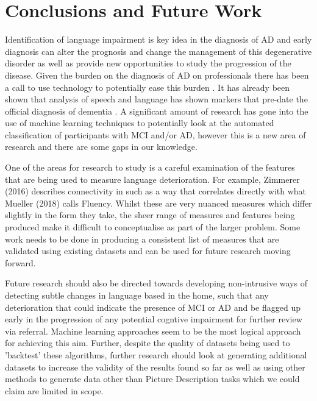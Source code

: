 \documentclass[a4paper]{article}
\begin{document}
\section{Conclusions and Future Work}
\par
Identification of language impairment is key idea in the diagnosis of AD and early diagnosis can alter the prognosis and change the management of this degenerative disorder as well as provide new opportunities to study the progression of the disease. Given the burden on the diagnosis of AD on professionals there has been a call to use technology to potentially ease this burden \cite{Boschi2017}. It has already been shown that analysis of speech and language has shown markers that pre-date the official diagnosis of dementia \cite{Snowdon1996, Berisha2015}. A significant amount of research has gone into the use of machine learning techniques to potentially look at the automated classification of participants with MCI and/or AD, however this is a new area of research and there are some gaps in our knowledge. \newline 
\par
One of the areas for research to study is a careful examination of the features that are being used to measure language deterioration. For example, Zimmerer (2016) \cite{Zimmerer2016} describes connectivity in such as a way that correlates directly with what Mueller (2018) \cite{Mueller2018a} calls Fluency. Whilst these are very nuanced measures which differ slightly in the form they take, the sheer range of measures and features being produced make it difficult to conceptualise as part of the larger problem. Some work needs to be done in producing a consistent list of measures that are validated using existing datasets and can be used for future research moving forward. \newline
\par
Future research should also be directed towards developing non-intrusive ways of detecting subtle changes in language based in the home, such that any deterioration that could indicate the presence of MCI or AD and be flagged up early in the progression of any potential cogntive impairment for further review via referral. Machine learning approaches seem to be the most logical approach for achieving this aim. Further, despite the quality of datasets being used to 'backtest' these algorithms, further research should look at generating additional datasets to increase the validity of the results found so far as well as using other methods to generate data other than Picture Description tasks which we could claim are limited in scope. \newline
\end{document}
